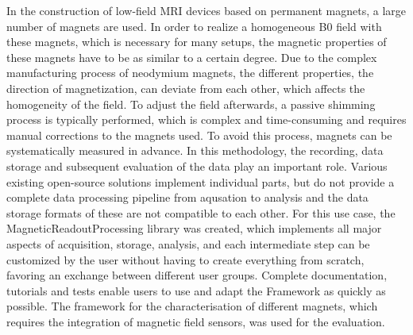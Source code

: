 In the construction of low-field MRI devices based on permanent magnets,
a large number of magnets are used. In order to realize a homogeneous B0
field with these magnets, which is necessary for many setups, the
magnetic properties of these magnets have to be as similar to a certain
degree. Due to the complex manufacturing process of neodymium magnets,
the different properties, the direction of magnetization, can deviate
from each other, which affects the homogeneity of the field. To adjust
the field afterwards, a passive shimming process is typically performed,
which is complex and time-consuming and requires manual corrections to
the magnets used. To avoid this process, magnets can be systematically
measured in advance. In this methodology, the recording, data storage
and subsequent evaluation of the data play an important role. Various
existing open-source solutions implement individual parts, but do not
provide a complete data processing pipeline from aqusation to analysis
and the data storage formats of these are not compatible to each other.
For this use case, the MagneticReadoutProcessing library was created,
which implements all major aspects of acquisition, storage, analysis,
and each intermediate step can be customized by the user without having
to create everything from scratch, favoring an exchange between
different user groups. Complete documentation, tutorials and tests
enable users to use and adapt the Framework as quickly as possible. The
framework for the characterisation of different magnets, which requires
the integration of magnetic field sensors, was used for the evaluation.
